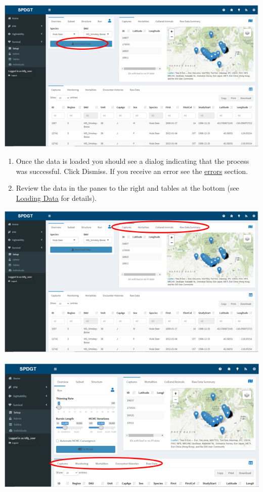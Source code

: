 \documentclass[
]{book}
\begin{document}
\includegraphics{./www/surv_02.PNG}

\begin{enumerate}
\def\labelenumi{\arabic{enumi}.}
\setcounter{enumi}{3}
\item
  Once the data is loaded you should see a dialog indicating that the process was successful. Click Dismiss. If you receive an error see the \protect\hyperlink{surv-errors}{errors} section.
\item
  Review the data in the panes to the right and tables at the bottom (see \protect\hyperlink{surv-load}{Loading Data} for details).
\end{enumerate}

\includegraphics{./www/surv_04.PNG}

\includegraphics{./www/surv_05.PNG}
\end{document}
